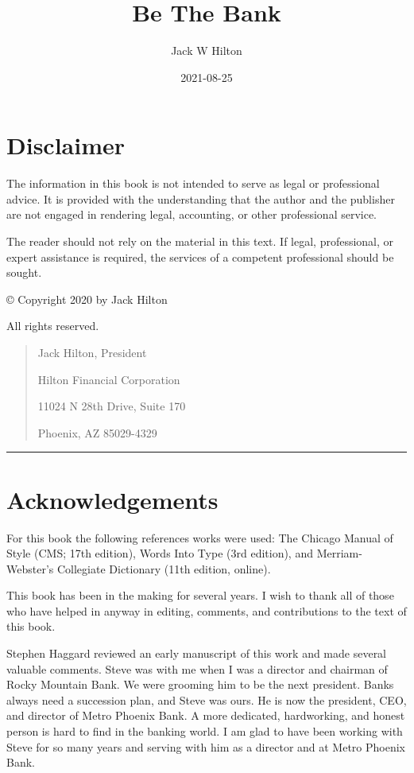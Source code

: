 \documentclass[
]{book}
\title{Be The Bank}
\author{Jack W Hilton}
\date{2021-08-25}
\begin{document}
\maketitle

{
\setcounter{tocdepth}{1}
\tableofcontents
}
\hypertarget{disclaimer}{%
\chapter*{Disclaimer}\label{disclaimer}}


The information in this book is not intended to serve as legal or professional advice. It is provided with the understanding that the author and the publisher are not engaged in rendering legal, accounting, or other professional service.

The reader should not rely on the material in this text. If legal, professional, or expert assistance is required, the services of a competent professional should be sought.

© Copyright 2020 by Jack Hilton

All rights reserved.

\begin{quote}
Jack Hilton, President

Hilton Financial Corporation

11024 N 28th Drive, Suite 170

Phoenix, AZ 85029-4329
\end{quote}

\begin{center}\rule{0.5\linewidth}{0.5pt}\end{center}

\hypertarget{acknowledgements}{%
\chapter*{Acknowledgements}\label{acknowledgements}}


For this book the following references works were used: The Chicago Manual of Style (CMS; 17th edition), Words Into Type (3rd edition), and Merriam-Webster's Collegiate Dictionary (11th edition, online).

This book has been in the making for several years. I wish to thank all of those who have helped in anyway in editing, comments, and contributions to the text of this book.

Stephen Haggard reviewed an early manuscript of this work and made several valuable comments. Steve was with me when I was a director and chairman of Rocky Mountain Bank. We were grooming him to be the next president. Banks always need a succession plan, and Steve was ours. He is now the president, CEO, and director of Metro Phoenix Bank. A more dedicated, hardworking, and honest person is hard to find in the banking world. I am glad to have been working with Steve for so many years and serving with him as a director and at Metro Phoenix Bank.
\end{document}
